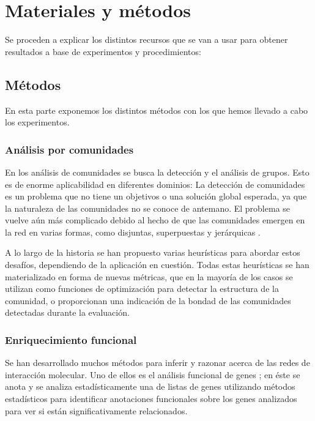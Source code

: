 \section{Materiales y métodos}

Se proceden a explicar los distintos recursos que se van a usar para obtener resultados a base de experimentos y procedimientos:

\subsection{Métodos}

En esta parte exponemos los distintos métodos con los que hemos llevado a cabo los experimentos.

\subsubsection{Análisis por comunidades}

En los análisis de comunidades \cite{Comun_Analisis} se busca la detección y el análisis de grupos. Esto es de enorme aplicabilidad en diferentes dominios: La detección de comunidades es un problema que no tiene un objetivos o una solución global esperada, ya que la naturaleza de las comunidades no se conoce de antemano. El problema se vuelve aún más complicado debido al hecho de que las comunidades emergen en la red en varias formas, como disjuntas, superpuestas y jerárquicas \cite{ComAnalisisStruct}.

\hfill

A lo largo de la historia se han propuesto varias heurísticas \cite{Comun_Analisis_2} para abordar estos desafíos, dependiendo de la aplicación en cuestión. Todas estas heurísticas se han materializado en forma de nuevas métricas, que en la mayoría de los casos se utilizan como funciones de optimización para detectar la estructura de la comunidad, o proporcionan una indicación de la bondad de las comunidades detectadas durante la evaluación.

\hfill

\subsubsection{Enriquecimiento funcional}

Se han desarrollado muchos métodos para inferir y razonar acerca de las redes de interacción molecular. Uno de ellos es el análisis funcional de genes \cite{enriquecimiento}; en éste se anota y se analiza estadísticamente una de listas de genes utilizando métodos estadísticos para identificar anotaciones funcionales sobre los genes analizados para ver si están significativamente relacionados.


